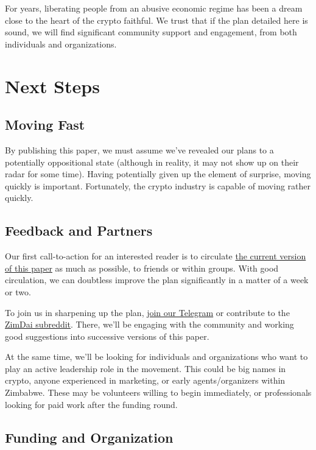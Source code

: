 \documentclass{article}
\begin{document}
For years, liberating people from an abusive economic regime has been a dream close to the heart of the crypto faithful. We trust that if the plan detailed here is sound, we will find significant community support and engagement, from both individuals and organizations.

\section{Next Steps} \label{next steps}

\subsection{Moving Fast} \label{moving fast}

By publishing this paper, we must assume we've revealed our plans to a potentially oppositional state (although in reality, it may not show up on their radar for some time). Having potentially given up the element of surprise, moving quickly is important. Fortunately, the crypto industry is capable of moving rather quickly.

\subsection{Feedback and Partners} \label{feedback and partners}

Our first call-to-action for an interested reader is to circulate \href{https://github.com/coinop-logan/ZimDai/blob/master/whitepaper.pdf}{the current version of this paper} as much as possible, to friends or within groups. With good circulation, we can doubtless improve the plan significantly in a matter of a week or two.

To join us in sharpening up the plan, \href{https://t.me/joinchat/EGlTfRYexSWmSy-C75Q2Xw}{join our Telegram} or contribute to the \href{https://www.reddit.com/r/ZimDai}{ZimDai subreddit}. There, we'll be engaging with the community and working good suggestions into successive versions of this paper.

At the same time, we'll be looking for individuals and organizations who want to play an active leadership role in the movement. This could be big names in crypto, anyone experienced in marketing, or early agents/organizers within Zimbabwe. These may be volunteers willing to begin immediately, or professionals looking for paid work after the funding round.

\subsection{Funding and Organization} \label{funding and organization}
\end{document}
